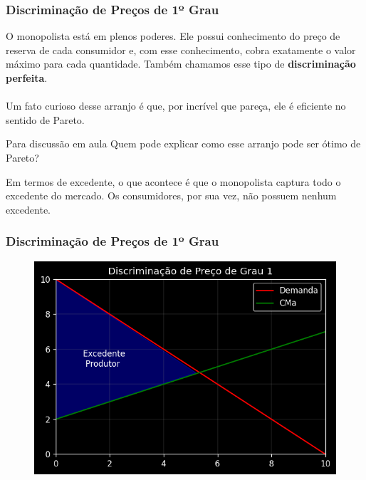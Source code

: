 \documentclass{beamer}[10]
\begin{document}

\begin{frame}
	\frametitle{Discriminação de Preços de 1º Grau}

	O monopolista está em plenos poderes. Ele possui conhecimento do preço de reserva de cada consumidor e, com esse conhecimento, cobra exatamente o valor máximo para cada quantidade. Também chamamos esse tipo de \textbf{discriminação perfeita}.
	\\~\\
	Um fato curioso desse arranjo é que, por incrível que pareça, ele é eficiente no sentido de Pareto.
	
	\begin{block}{Para discussão em aula}
		Quem pode explicar como esse arranjo pode ser ótimo de Pareto?
	\end{block}

	Em termos de excedente, o que acontece é que o monopolista captura todo o excedente do mercado. Os consumidores, por sua vez, não possuem nenhum excedente.
\end{frame}

\begin{frame}
	\frametitle{Discriminação de Preços de 1º Grau}

	\begin{figure}[H]
		\centering
		\includegraphics[scale=0.75]{cap26_2-discriminacao_grau1.png}
	\end{figure}

\end{frame}
\end{document}
